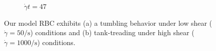 \begin{figure}[t]
\begin{subfigure}{\textwidth}
\begin{minipage}{0.2\textwidth}
        $\dot{\gamma}t = 47$
    \end{minipage}%
    \label{fig:tread}
    \end{subfigure}
    \caption{%
        Our model RBC exhibits (a) a tumbling behavior under low shear
        ($\dot{\gamma} = 50\si{\per\second}$) conditions and (b) tank-treading under high
        shear ($\dot{\gamma} = 1000\si{\per\second}$) conditions.
    }%
    \label{fig:tumble-tread}
\end{figure}

%
